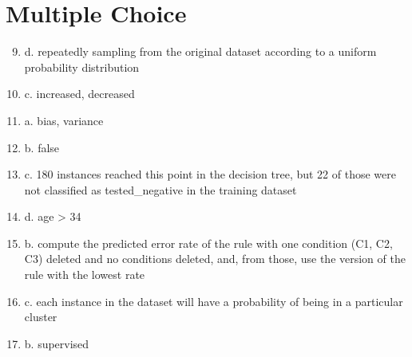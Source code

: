\documentclass[12pt]{scrartcl}
\begin{document}
\section*{Multiple Choice}
\begin{enumerate}
    \setcounter{enumi}{8}

    \item d. repeatedly sampling from the original dataset according to a uniform probability distribution
    \item c. increased, decreased
    \item a. bias, variance
    \item b. false
    \item c. 180 instances reached this point in the decision tree, but 22 of those were not classified as tested\_negative in the training dataset
    \item d. age > 34
    \item b. compute the predicted error rate of the rule with one condition (C1, C2, C3) deleted and no conditions deleted, and, from those, use the version of the rule with the lowest rate
    \item c. each instance in the dataset will have a probability of being in a particular cluster
    \item b. supervised
\end{enumerate}
\end{document}
